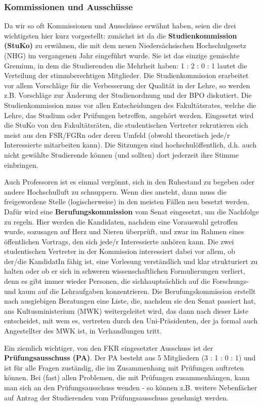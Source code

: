 \begin{multicols}{2}
	\subsubsection*{Kommissionen und Ausschüsse}
		Da wir so oft Kommissionen und Ausschüsse erwähnt haben, seien die drei wichtigsten hier kurz vorgestellt: zunächst ist da die \textbf{Studienkommission (StuKo)} zu erwähnen, die mit dem neuen Niedersächsischen Hochschulgesetz (NHG) im vergangenen Jahr eingeführt wurde. Sie ist das einzige gemischte Gremium, in dem die Studierenden die Mehrheit haben: 1 : 2 : 0 : 1 lautet die Verteilung der stimmberechtigen Mitglieder. Die Studienkommission erarbeitet vor allem Vorschläge für die Verbesserung der Qualität in der Lehre, so werden z.B. Vorschläge zur Änderung der Studienordnung und der BPO diskutiert. Die Studienkommission muss vor allen Entscheidungen des Fakultätsrates, welche die Lehre, das Studium oder Prüfungen betreffen, angehört werden. Eingesetzt wird die StuKo von den Fakultätsräten, die studentischen Vertreter rekrutieren sich meist aus den FSR/FGRn oder deren Umfeld (obwohl theoretisch jede/r Interessierte mitarbeiten kann). Die Sitzungen sind hochschulöffentlich, d.h. auch nicht gewählte Studierende können (und sollten) dort jederzeit ihre Stimme einbringen.

		Auch Professoren ist es einmal vergönnt, sich in den Ruhestand zu begeben oder andere Hochschulluft zu schnuppern. Wenn dies ansteht, dann muss die freigewordene Stelle (logischerweise) in den meisten Fällen neu besetzt werden. Dafür wird eine \textbf{Berufungskommission} vom Senat eingesetzt, um die Nachfolge zu regeln. Hier werden die Kandidaten, nachdem eine Vorauswahl getroffen wurde, sozusagen auf Herz und Nieren überprüft, und zwar im Rahmen eines öffentlichen Vortrags, den sich jede/r Interessierte anhören kann. Die zwei studentischen Vertreter in der Kommission interessiert dabei vor allem, ob der/die KandidatIn fähig ist, eine Vorlesung verständlich und klar strukturiert zu halten oder ob er sich in schweren wissenschaftlichen Formulierungen verliert, denn es gibt immer wieder Personen, die sichhauptsächlich auf die Forschungs- und kaum auf die Lehraufgaben konzentrieren. Die Berufungskommission erstellt nach ausgiebigen Beratungen eine Liste, die, nachdem sie den Senat passiert hat, ans Kultusministerium (MWK) weitergeleitet wird, das dann nach dieser Liste entscheidet, mit wem es, vertreten durch den Uni-Präsidenten, der ja formal auch Angestellter des MWK ist, in Verhandlungen tritt.

		Ein ziemlich wichtiger, von den FKR eingesetzter Ausschuss ist der \textbf{Prüfungsausschuss (PA)}. Der PA besteht aus 5 Mitgliedern (3 : 1 : 0 : 1) und ist für alle Fragen zuständig, die im Zusammenhang mit Prüfungen auftreten können. Bei (fast) allen Problemen, die mit Prüfungen zusammenhängen, kann man sich an den Prüfungsausschuss wenden - so können z.B. weitere Nebenfächer auf Antrag der Studierenden vom Prüfungsausschuss genehmigt werden. 


\end{multicols}
